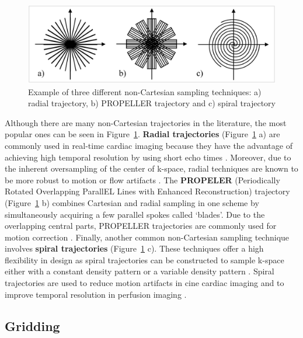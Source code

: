 \begin{figure}[ht]
    \centering
    \includegraphics[width=1\textwidth,keepaspectratio]{images/mri/noncarttraj}
    \caption{Example of three different non-Cartesian sampling techniques: a) radial trajectory, b) PROPELLER trajectory and c) spiral trajectory}
    \label{fig:noncarttraj}
\end{figure}

Although there are many non-Cartesian trajectories in the literature, the most popular ones can be seen in Figure~\ref{fig:noncarttraj}.
\textbf{Radial trajectories} (Figure~\ref{fig:noncarttraj} a) are commonly used in 
real-time cardiac imaging because they have the advantage of achieving high temporal resolution by using short echo times \cite{Seiberlich2011} \cite{Schaeffter2001}.
Moreover, due to the inherent oversampling of the center of k-space, radial techniques are known to be more robust to motion or flow artifacts \cite{Pauly1992}.
The \textbf{PROPELER} (Periodically Rotated Overlapping ParallEL Lines with Enhanced Reconstruction) trajectory (Figure~\ref{fig:noncarttraj} b) combines Cartesian and radial sampling in one scheme by simultaneously acquiring a few parallel spokes called `blades'. 
Due to the overlapping central parts, PROPELLER trajectories are commonly used for motion correction \cite{Pipe1999}.
Finally, another common non-Cartesian sampling technique involves \textbf{spiral trajectories} (Figure~\ref{fig:noncarttraj} c). 
These techniques offer a high flexibility in design as spiral trajectories can be constructed to sample k-space either with a constant density pattern \cite{Ahn1986} \cite{Meyer1992} or a variable density pattern \cite{Tsai2000}.
Spiral trajectories are used to reduce motion artifacts in cine cardiac imaging \cite{Kressler2007} and to improve temporal resolution in perfusion imaging \cite{Lee2003}.

\hfill

\subsection{Gridding}
\label{MRIgridding}

